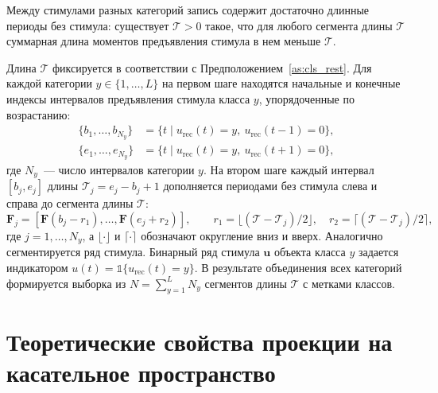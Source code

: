 \begin{assumption}\label{as:cls_rest}
Между стимулами разных категорий запись содержит достаточно длинные периоды без стимула: существует $\mathcal{T} > 0$ такое, что для любого сегмента длины $\mathcal{T}$ суммарная длина моментов предъявления стимула в нем меньше $\mathcal{T}$.
\end{assumption}

Длина $\mathcal{T}$ фиксируется в соответствии с Предположением~\ref{as:cls_rest}. Для каждой категории $y \in \{1,\dots,L\}$ на первом шаге находятся начальные и конечные индексы интервалов предъявления стимула класса $y$, упорядоченные по возрастанию:
\begin{align*}
\{b_{1}, \ldots, b_{N_{y}}\} &= \{t \mid u_{\mathrm{rec}}(t)=y,\ u_{\mathrm{rec}}(t-1)=0\},\\
\{e_{1}, \ldots, e_{N_{y}}\} &= \{t \mid u_{\mathrm{rec}}(t)=y,\ u_{\mathrm{rec}}(t+1)=0\},
\end{align*}
где $N_{y}$~--- число интервалов категории $y$. На втором шаге каждый интервал $[b_{j}, e_{j}]$ длины $\mathcal{T}_{j} = e_{j} - b_{j} + 1$ дополняется периодами без стимула слева и справа до сегмента длины $\mathcal{T}$:
\begin{equation*}
\mathbf{F}_{j} = [\mathbf{F}(b_{j}-r_1), \ldots, \mathbf{F}(e_{j}+r_2)],
\qquad
r_1 = \lfloor (\mathcal{T} - \mathcal{T}_{j})/2 \rfloor, \quad r_2 = \lceil (\mathcal{T} - \mathcal{T}_{j})/2 \rceil,
\end{equation*}
где $j = 1,\ldots, N_{y}$, а $\lfloor \cdot \rfloor$ и $\lceil \cdot \rceil$ обозначают округление вниз и вверх. Аналогично сегментируется ряд стимула. Бинарный ряд стимула $\mathbf{u}$ объекта класса $y$ задается индикатором $u(t) = \mathds{1}\{u_{\mathrm{rec}}(t) = y\}$. В результате объединения всех категорий формируется выборка из $N = \sum_{y=1}^{L} N_y$ сегментов длины $\mathcal{T}$ с метками классов.

\section{Теоретические свойства проекции на касательное пространство}\label{sec3:cls_theory}

